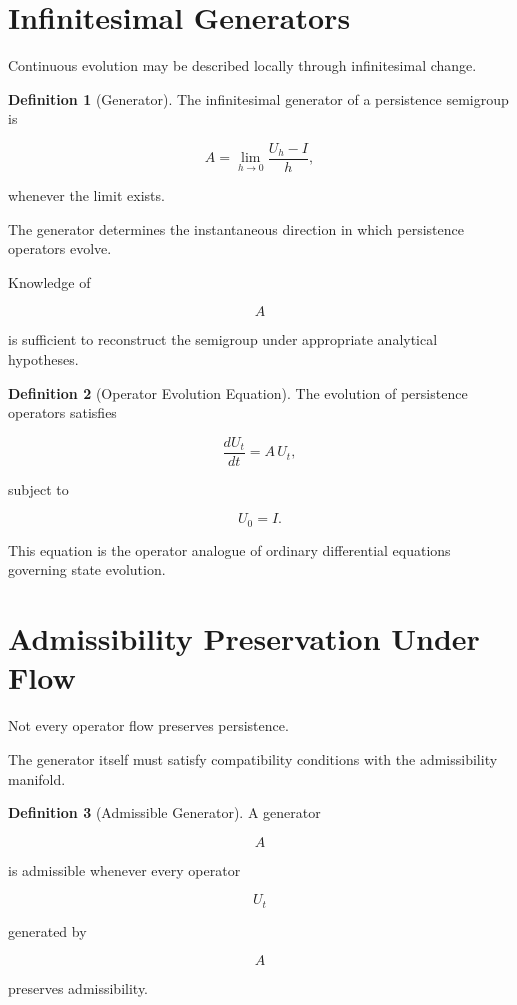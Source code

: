 \documentclass[11pt]{book}
\numberwithin{equation}{chapter}
\theoremstyle{definition}
\newtheorem{definition}{Definition}[chapter]
\theoremstyle{plain}
\begin{document}
\section{Infinitesimal Generators}

Continuous evolution may be described locally through infinitesimal
change.

\begin{definition}[Generator]

The infinitesimal generator of a persistence semigroup is

\[
A
=
\lim_{h\to0}
\frac{U_h-I}{h},
\]

whenever the limit exists.

\end{definition}

The generator determines the instantaneous direction in which
persistence operators evolve.

Knowledge of

\[
A
\]

is sufficient to reconstruct the semigroup under appropriate
analytical hypotheses.

\begin{definition}[Operator Evolution Equation]

The evolution of persistence operators satisfies

\[
\frac{dU_t}{dt}
=
A\,U_t,
\]

subject to

\[
U_0
=
I.
\]

\end{definition}

This equation is the operator analogue of ordinary differential
equations governing state evolution.

\section{Admissibility Preservation Under Flow}

Not every operator flow preserves persistence.

The generator itself must satisfy compatibility conditions with the
admissibility manifold.

\begin{definition}[Admissible Generator]

A generator

\[
A
\]

is admissible whenever every operator

\[
U_t
\]

generated by

\[
A
\]

preserves admissibility.

\end{definition}
\end{document}
